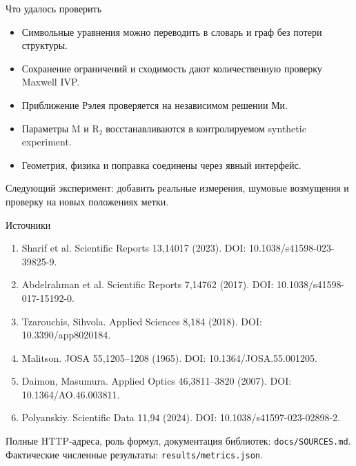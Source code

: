 \documentclass[aspectratio=169,11pt]{beamer}
\begin{document}
\begin{frame}{Что удалось проверить}
\begin{itemize}
\item Символьные уравнения можно переводить в словарь и граф без потери структуры.
\item Сохранение ограничений и сходимость дают количественную проверку Maxwell IVP.
\item Приближение Рэлея проверяется на независимом решении Ми.
\item Параметры M и R₂ восстанавливаются в контролируемом synthetic experiment.
\item Геометрия, физика и поправка соединены через явный интерфейс.
\end{itemize}
\vspace{4mm}
Следующий эксперимент: добавить реальные измерения, шумовые возмущения и проверку на новых положениях метки.
\end{frame}

\begin{frame}{Источники}
\scriptsize
\begin{enumerate}
\item Sharif et al. Scientific Reports 13,14017 (2023). DOI: 10.1038/s41598-023-39825-9.
\item Abdelrahman et al. Scientific Reports 7,14762 (2017). DOI: 10.1038/s41598-017-15192-0.
\item Tzarouchis, Sihvola. Applied Sciences 8,184 (2018). DOI: 10.3390/app8020184.
\item Malitson. JOSA 55,1205–1208 (1965). DOI: 10.1364/JOSA.55.001205.
\item Daimon, Masumura. Applied Optics 46,3811–3820 (2007). DOI: 10.1364/AO.46.003811.
\item Polyanskiy. Scientific Data 11,94 (2024). DOI: 10.1038/s41597-023-02898-2.
\end{enumerate}
\vspace{4mm}
Полные HTTP-адреса, роль формул, документация библиотек: \texttt{docs/SOURCES.md}. Фактические численные результаты: \texttt{results/metrics.json}.
\end{frame}
\end{document}
